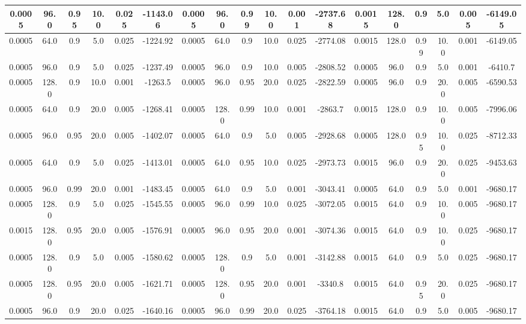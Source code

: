 \begin{table}[h]
\begin{tabular}{|c|c|c|c|c|c||c|c|c|c|c|c||c|c|c|c|c|c|}
    \hline
    0.0005 & 96.0 & 0.95 & 10.0 & 0.025 & -1143.06 & 0.0005 & 96.0 & 0.99 & 10.0 & 0.001 & -2737.68 & 0.0015 & 128.0 & 0.9 & 5.0 & 0.005 & -6149.05 \\
    \hline
    0.0005 & 64.0 & 0.9 & 5.0 & 0.025 & -1224.92 & 0.0005 & 64.0 & 0.9 & 10.0 & 0.025 & -2774.08 & 0.0015 & 128.0 & 0.99 & 10.0 & 0.001 & -6149.05 \\
    \hline
    0.0005 & 96.0 & 0.9 & 5.0 & 0.025 & -1237.49 & 0.0005 & 96.0 & 0.9 & 10.0 & 0.005 & -2808.52 & 0.0005 & 96.0 & 0.9 & 5.0 & 0.001 & -6410.7 \\
    \hline
    0.0005 & 128.0 & 0.9 & 10.0 & 0.001 & -1263.5 & 0.0005 & 96.0 & 0.95 & 20.0 & 0.025 & -2822.59 & 0.0005 & 96.0 & 0.9 & 20.0 & 0.005 & -6590.53 \\
    \hline
    0.0005 & 64.0 & 0.9 & 20.0 & 0.005 & -1268.41 & 0.0005 & 128.0 & 0.99 & 10.0 & 0.001 & -2863.7 & 0.0015 & 128.0 & 0.9 & 10.0 & 0.005 & -7996.06 \\
    \hline
    0.0005 & 96.0 & 0.95 & 20.0 & 0.005 & -1402.07 & 0.0005 & 64.0 & 0.9 & 5.0 & 0.005 & -2928.68 & 0.0005 & 128.0 & 0.95 & 10.0 & 0.025 & -8712.33 \\
    \hline
    0.0005 & 64.0 & 0.9 & 5.0 & 0.025 & -1413.01 & 0.0005 & 64.0 & 0.95 & 10.0 & 0.025 & -2973.73 & 0.0015 & 96.0 & 0.9 & 20.0 & 0.025 & -9453.63 \\
    \hline
    0.0005 & 96.0 & 0.99 & 20.0 & 0.001 & -1483.45 & 0.0005 & 64.0 & 0.9 & 5.0 & 0.001 & -3043.41 & 0.0005 & 64.0 & 0.9 & 5.0 & 0.001 & -9680.17 \\
    \hline
    0.0005 & 128.0 & 0.9 & 5.0 & 0.025 & -1545.55 & 0.0005 & 96.0 & 0.99 & 10.0 & 0.025 & -3072.05 & 0.0015 & 64.0 & 0.9 & 10.0 & 0.005 & -9680.17 \\
    \hline
    0.0015 & 128.0 & 0.95 & 20.0 & 0.005 & -1576.91 & 0.0005 & 96.0 & 0.95 & 20.0 & 0.001 & -3074.36 & 0.0015 & 64.0 & 0.9 & 10.0 & 0.025 & -9680.17 \\
    \hline
    0.0005 & 128.0 & 0.9 & 5.0 & 0.005 & -1580.62 & 0.0005 & 128.0 & 0.9 & 5.0 & 0.001 & -3142.88 & 0.0015 & 64.0 & 0.9 & 5.0 & 0.025 & -9680.17 \\
    \hline
    0.0005 & 128.0 & 0.95 & 20.0 & 0.005 & -1621.71 & 0.0005 & 128.0 & 0.95 & 20.0 & 0.001 & -3340.8 & 0.0015 & 64.0 & 0.95 & 20.0 & 0.025 & -9680.17 \\
    \hline
    0.0005 & 96.0 & 0.9 & 20.0 & 0.025 & -1640.16 & 0.0005 & 96.0 & 0.99 & 20.0 & 0.025 & -3764.18 & 0.0015 & 64.0 & 0.9 & 5.0 & 0.005 & -9680.17 \\

\end{tabular}
\end{table}
